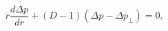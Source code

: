 \begin{equation}\label{covconteq}
  r\frac{d\Delta p}{dr}+(D-1)(\Delta p-\Delta p_{\perp })=0.
\end{equation}

